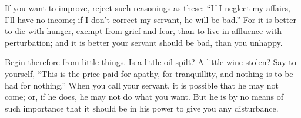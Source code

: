If you  want to  improve, reject such  reasonings as these:  ``If I  neglect my
affairs, I'll have no income; if I  don't correct my servant, he will be bad.''
For it is better  to die with hunger, exempt from grief and  fear, than to live
in affluence  with perturbation; and it  is better your servant  should be bad,
than you unhappy.

Begin  therefore from  little things.  Is  a little  oil spilt?  A little  wine
stolen? Say to yourself, ``This is the price paid for apathy, for tranquillity,
and nothing  is to  be had  for nothing.'' When  you call  your servant,  it is
possible that he may not come; or, if he does, he may not do what you want. But
he is by no means of such importance that it should be in his power to give you
any disturbance.
